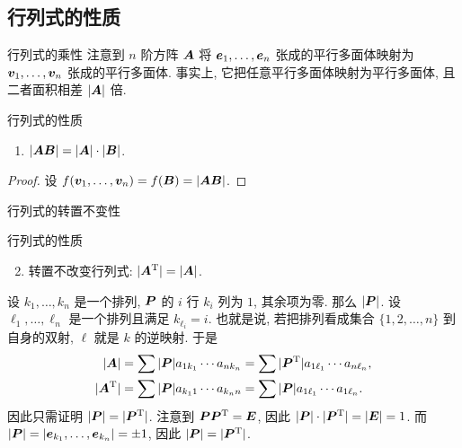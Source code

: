 \subsection{行列式的性质}

\begin{frame}{行列式的乘性}
	\onslide<+->
	注意到 $n$ 阶方阵 ${\boldsymbol{A}}$ 将 ${\boldsymbol{e}}_1,\dots,{\boldsymbol{e}}_n$ 张成的平行多面体映射为 ${\boldsymbol{v}}_1,\dots,{\boldsymbol{v}}_n$ 张成的平行多面体.
	\onslide<+->
	事实上, 它把任意平行多面体映射为平行多面体, 且二者面积相差 $|{\boldsymbol{A}}|$ 倍.
	\onslide<+->
	\begin{second}{行列式的性质}
		\begin{enumerate}
			\item $|{\boldsymbol{A}}{\boldsymbol{B}}|=|{\boldsymbol{A}}|\cdot|{\boldsymbol{B}}|$.
		\end{enumerate}
	\end{second}
	\onslide<+->
	\begin{proof}
		设 $f({\boldsymbol{v}}_1,\dots,{\boldsymbol{v}}_n)=f({\boldsymbol{B}})=|{\boldsymbol{A}}{\boldsymbol{B}}|$.
		\onslide<+->{%
			因此 $f(\bfB)=f(\bfE)|\bfB|=|\bfA|\cdot |\bfB|$.\qedhere
		}
	\end{proof}
\end{frame}


\begin{frame}{行列式的转置不变性}
	\onslide<+->
	\begin{second}{行列式的性质}
		\begin{enumerate}
			\setcounter{enumi}{1}
			\item 转置不改变行列式: $|{\boldsymbol{A}}^{\mathrm{T}}|=|{\boldsymbol{A}}|$.
		\end{enumerate}
	\end{second}
	\onslide<+->
	设 $k_1,\dots,k_n$ 是一个排列, ${\boldsymbol{P}}$ 的 $i$ 行 $k_i$ 列为 $1$, 其余项为零.
	\onslide<+->
	那么 $|{\boldsymbol{P}}|$.
	\onslide<+->
	设 $\ell_1,\dots,\ell_n$ 是一个排列且满足 $k_{\ell_i}=i$.
	\onslide<+->
	也就是说, 若把排列看成集合 $\{1,2,\dots,n\}$ 到自身的双射, $\ell$ 就是 $k$ 的逆映射.
	\onslide<+->
	于是
	\begin{align*}
		|{\boldsymbol{A}}|&=\sum|{\boldsymbol{P}}| a_{1k_1}\cdots a_{nk_n}=\sum|{\boldsymbol{P}}^{\mathrm{T}}| a_{1\ell_1}\cdots a_{n\ell_n},\\
		|{\boldsymbol{A}}^{\mathrm{T}}|&=\sum|{\boldsymbol{P}}| a_{k_1 1}\cdots a_{k_n n}=\sum|{\boldsymbol{P}}| a_{1\ell_1}\cdots a_{1 \ell_n}.
	\end{align*}
	\onslide<+->
	因此只需证明 $|{\boldsymbol{P}}|=|{\boldsymbol{P}}^{\mathrm{T}}|$.
	\onslide<+->
	注意到 ${\boldsymbol{P}}{\boldsymbol{P}}^{\mathrm{T}}={\boldsymbol{E}}$, 因此 $|{\boldsymbol{P}}|\cdot|{\boldsymbol{P}}^{\mathrm{T}}|=|{\boldsymbol{E}}|=1$.
	\onslide<+->
	而 $|{\boldsymbol{P}}|=|{\boldsymbol{e}}_{k_1},\dots,{\boldsymbol{e}}_{k_n}|=\pm1$, 因此 $|{\boldsymbol{P}}|=|{\boldsymbol{P}}^{\mathrm{T}}|$.
\end{frame}


